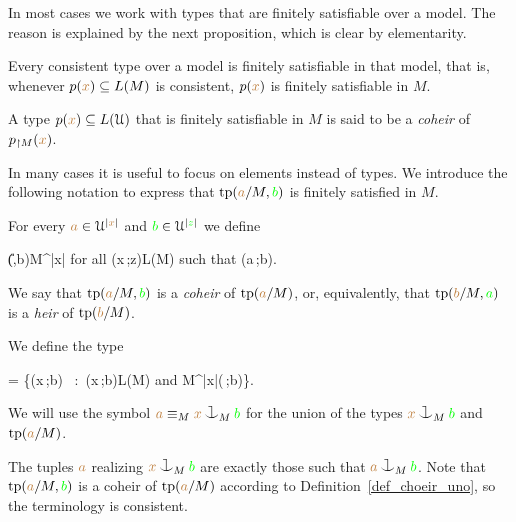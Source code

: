 \documentclass[creche.tex]{subfiles}
\begin{document}
In most cases we work with types that are finitely satisfiable over a model. The reason is explained by the next proposition, which is clear by elementarity.

\begin{proposition}\label{prop_coher_over_model}
    Every consistent type over a model is finitely satisfiable in that model, that is, whenever $p({\color{brown} x})\subseteq L(M)$ is consistent, $p({\color{brown} x})$ is finitely satisfiable in $M$. \QED
\end{proposition}

\begin{definition}\label{def_choeir_uno} A type $p({\color{brown} x}) \subseteq L(\EuScript U)$ that is finitely satisfiable in $M$ is said to be a \emph{coheir\/} of $p_{\restriction M}({\color{brown} x})$. \QED
\end{definition}


In many cases it is useful to focus on elements instead of types.
We introduce the following notation to express that ${\rm tp}({\color{brown} a}/M,{\color{green} b})$ is finitely satisfied in $M$.

\begin{definition}\label{def_coheir_idepencence} 
  For every ${\color{brown} a}\in\EuScript U^{|{\color{brown} x}|}$ and ${\color{green} b}\in\EuScript U^{|{\color{green} z}|}$ we define

  \noindent\llap{\textcolor{red}{\Large\danger}\kern1.5ex}
  {\IFF}
  {\phi({\mr\U},{\gr b})\cap M^{|{\mr x}|}\neq\0
  \textrm{ for all }\phi({\mr x}\,;{\gr z})\in L(M) 
  \textrm{ such that }\phi({\mr a}\,;{\gr b})}.

  We say that ${\rm tp}({\color{brown} a}/M,{\color{green} b})$ is a \emph{coheir} of ${\rm tp}({\color{brown} a}/M)$, or, equivalently, that ${\rm tp}({\color{brown} b}/M,{\color{green} a})$ is a \emph{heir} of ${\rm tp}({\color{brown} b}/M)$.
  
  We define the type

  {=}
  {\Big\{\phi({\mr x}\,;{\gr b})
  \ :\ 
  \phi({\mr x}\,;{\gr b})\in L(M)
  \textrm{ and } M^{|{\mr x}|}\subseteq\phi(\mrU\,;{\gr b})\Big\}.}

  We will use the symbol \emph{${\mr a}\equiv_M{\mr x}\cnonfork_M{\gr b}$} 
  for the union of the types ${\mr x}\cnonfork_M{\gr b}$ and 
  ${\rm tp}({\color{brown} a}/M)$.\QED
\end{definition}
 The tuples ${\color{brown} a}$ realizing ${\mr x}\cnonfork_M{\gr b}$ are exactly those such that ${\mr a}\cnonfork_M{\gr b}$. Note that ${\rm tp}({\color{brown} a}/M,{\color{green} b})$ is a coheir of ${\rm tp}({\color{brown} a}/M)$ according to Definition~\ref{def_choeir_uno}, so the terminology is consistent.
\end{document}
